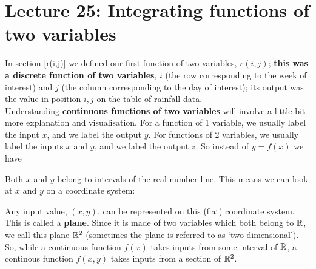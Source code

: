 \chapter{Lecture 25: Integrating functions of two variables} \label{double integral}
In section \ref{r(i,j)} we defined our first function of two variables, $r(i,j)$; \textbf{this was a discrete function of two variables}, $i$ (the row corresponding to the week of interest) and $j$ (the column corresponding to the day of interest); its output was the value in position $i,j$ on the table of rainfall data. \\

\noindent Understanding \textbf{continuous functions of two variables} will involve a little bit more explanation and visualisation. For a function of 1 variable, we usually label the input $x$, and we label the output $y$. For functions of 2 variables, we usually label the inputs $x$ and $y$, and we label the output $z$. So instead of $y = f(x)$ we have

  	\bigskip
	
	\hfil{}
	\bigskip
	\bigskip

Both $x$ and $y$ belong to intervals of the real number line. This means we can look at $x$ and $y$ on a coordinate system:
\begin{center}
\end{center}
Any input value, $(x,y)$, can be represented on this (flat) coordinate system. This is called a \textbf{plane}. Since it is made of two variables which both belong to $\mathbb{R}$, we call this plane $\mathbb{R}^2$ (sometimes the plane is referred to as `two dimensional'). So, while a continuous function $f(x)$ takes inputs from some interval of $\mathbb{R}$, a continous function $f(x,y)$ takes inputs from a section of $\mathbb{R}^2$. \\

